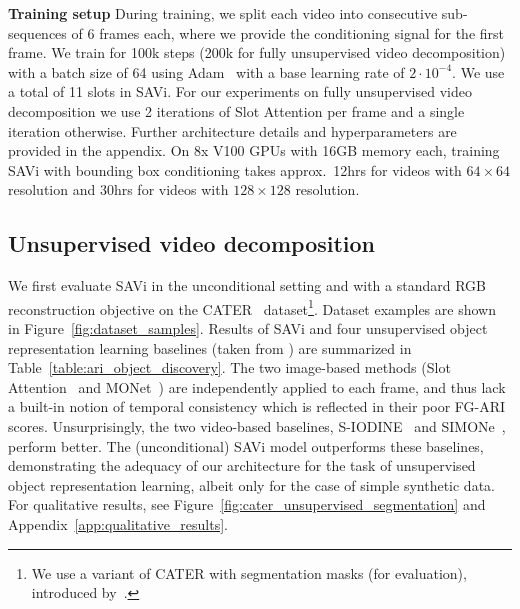 \documentclass{article}
\newcommand{\modelname}{SAVi\xspace}
\begin{document}
\textbf{Training setup}\quad
During training, we split each video into consecutive sub-sequences of 6 frames each, where we provide the conditioning signal for the first frame. We train for 100k steps (200k for fully unsupervised video decomposition) with a batch size of 64 using Adam~\citep{kingma2014adam} with a base learning rate of $2\cdot10^{-4}$. We use a total of 11 slots in \modelname. For our experiments on fully unsupervised video decomposition we use 2 iterations of Slot Attention per frame and a single iteration otherwise. Further architecture details and hyperparameters are provided in the appendix. On 8x V100 GPUs with 16GB memory each, training \modelname with bounding box conditioning takes approx.~12hrs for videos with $64\times64$ resolution and 30hrs for videos with $128\times128$ resolution.

\subsection{Unsupervised video decomposition}
We first evaluate \modelname in the unconditional setting and with a standard RGB reconstruction objective on the CATER~\citep{girdhar2019cater} dataset\footnote{We use a variant of CATER with segmentation masks (for evaluation), introduced by~\citet{kabra2021simone}.}. Dataset examples are shown in Figure~\ref{fig:dataset_samples}.
Results of \modelname and four unsupervised object representation learning baselines (taken from \citet{kabra2021simone}) are summarized in Table~\ref{table:ari_object_discovery}.
The two image-based methods (Slot Attention~\citep{locatello2020object} and MONet~\citep{burgess2019monet}) are independently applied to each frame, and thus lack a built-in notion of temporal consistency which is reflected in their poor FG-ARI scores. 
Unsurprisingly, the two video-based baselines, S-IODINE~\citep{greff2019multi} and SIMONe~\citep{kabra2021simone}, perform better.
The (unconditional) \modelname model outperforms these baselines, demonstrating the adequacy of our architecture for the task of unsupervised object representation learning, albeit only for the case of simple synthetic data. For qualitative results, see Figure~\ref{fig:cater_unsupervised_segmentation} and Appendix~\ref{app:qualitative_results}.
\end{document}
